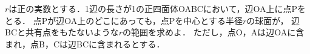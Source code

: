 \documentclass[../../main.tex]{subfiles}
\begin{document}
$r$は正の実数とする．1辺の長さが1の正四面体OABCにおいて，辺OA上に点Pをとる．
点Pが辺OA上のどこにあっても，点Pを中心とする半径$r$の球面が，
辺BCと共有点をもたないような$r$の範囲を求めよ．
ただし，点O，Aは辺OAに含まれ，点B，Cは辺BCに含まれるとする．
\end{document}

